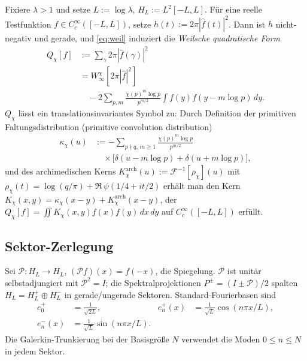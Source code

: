\documentclass[a4paper,10pt,twocolumn]{article}
\theoremstyle{definition}
\theoremstyle{remark}
\newcommand{\chifn}{\chi}
\begin{document}
Fixiere $\lambda>1$ und setze $L:=\log\lambda$, $H_L:=L^2[-L,L]$. Für eine
reelle Testfunktion $f\in C_c^\infty([-L,L])$, setze
$h(t):=2\pi|\hat f(t)|^2$. Dann ist $h$ nicht-negativ und gerade, und
\eqref{eq:weil} induziert die \emph{Weilsche quadratische Form}
\begin{equation}
\label{eq:weil-qf}
\begin{aligned}
  Q_{\chifn}[f]
    &:=\sum_{\gamma}2\pi|\hat f(\gamma)|^2 \\
    &=W^{\chifn}_\infty[2\pi|\hat f|^2] \\
    &\quad -2\sum_{p,m}\frac{\chifn(p)^m\log p}{p^{m/2}}
      \int f(y)f(y-m\log p)\,dy.
\end{aligned}
\end{equation}
$Q_{\chifn}$ lässt ein translationsinvariantes Symbol zu: Durch Definition der
primitiven Faltungsdistribution (primitive convolution distribution)
\begin{equation}
\label{eq:kappa}
\begin{aligned}
  \kappa_{\chifn}(u)
    &:=-\sum_{p\nmid q,\,m\geq 1}
      \frac{\chifn(p)^m\log p}{p^{m/2}} \\
    &\quad\times
      \bigl[\delta(u-m\log p)+\delta(u+m\log p)\bigr],
\end{aligned}
\end{equation}
und des archimedischen Kerns
$K^{\mathrm{arch}}_{\chifn}(u):=\mathcal{F}^{-1}[\rho_{\chifn}](u)$
mit $\rho_{\chifn}(t)=\log(q/\pi)+\Re\,\psi(1/4+it/2)$ erhält man
den Kern
$K_{\chifn}(x,y)=\kappa_{\chifn}(x-y)+K^{\mathrm{arch}}_{\chifn}(x-y)$,
der $Q_{\chifn}[f]=\iint K_{\chifn}(x,y)f(x)f(y)\,dx\,dy$ auf
$C_c^\infty([-L,L])$ erfüllt.

\subsection{Sektor-Zerlegung}

Sei $\mathcal{P}:H_L\to H_L$, $(\mathcal{P}f)(x)=f(-x)$, die
Spiegelung. $\mathcal{P}$ ist unitär selbstadjungiert mit $\mathcal{P}^2
=I$; die Spektralprojektionen $P^\pm=(I\pm\mathcal{P})/2$ spalten
$H_L=H_L^+\oplus H_L^-$ in gerade/ungerade Sektoren. Standard-Fourierbasen
sind
\[
\begin{aligned}
  e_0^+&=\tfrac{1}{\sqrt{2L}}, &
  e_n^+(x)&=\tfrac{1}{\sqrt L}\cos(n\pi x/L),\\
  e_n^-(x)&=\tfrac{1}{\sqrt L}\sin(n\pi x/L).
\end{aligned}
\]
Die Galerkin-Trunkierung bei der Basisgröße $N$ verwendet die Moden $0\leq n\leq N$
in jedem Sektor.
\end{document}
